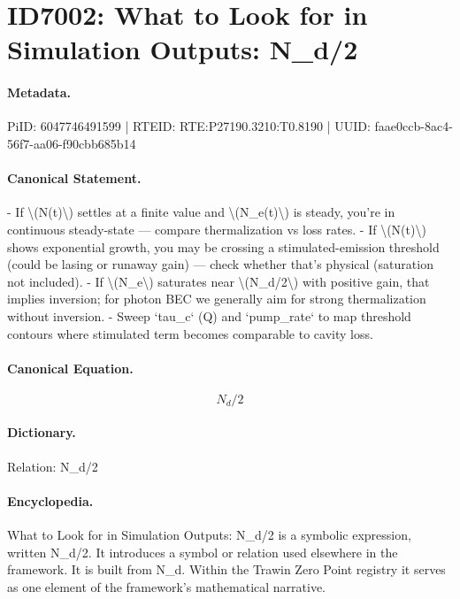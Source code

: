 \section*{ID7002: What to Look for in Simulation Outputs: N\_d/2}
\paragraph{Metadata.}
PiID: 6047746491599 | RTEID: RTE:P27190.3210:T0.8190 | UUID: faae0ccb-8ac4-56f7-aa06-f90cbb685b14

\paragraph{Canonical Statement.}
- If \textbackslash{}(N(t)\textbackslash{}) settles at a finite value and \textbackslash{}(N\_e(t)\textbackslash{}) is steady, you’re in continuous steady-state — compare thermalization vs loss rates. - If \textbackslash{}(N(t)\textbackslash{}) shows exponential growth, you may be crossing a stimulated-emission threshold (could be lasing or runaway gain) — check whether that’s physical (saturation not included). - If \textbackslash{}(N\_e\textbackslash{}) saturates near \textbackslash{}(N\_d/2\textbackslash{}) with positive gain, that implies inversion; for photon BEC we generally aim for strong thermalization without inversion. - Sweep `tau\_c` (Q) and `pump\_rate` to map threshold contours where stimulated term becomes comparable to cavity loss.

\paragraph{Canonical Equation.}
\[
N_d/2
\]

\paragraph{Dictionary.}
Relation: N\_d/2

\paragraph{Encyclopedia.}
What to Look for in Simulation Outputs: N\_d/2 is a symbolic expression, written N\_d/2. It introduces a symbol or relation used elsewhere in the framework. It is built from N\_d. Within the Trawin Zero Point registry it serves as one element of the framework's mathematical narrative.
